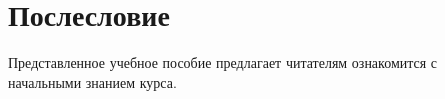 \chapter*{Послесловие}

Представленное учебное пособие предлагает читателям ознакомится с начальными знанием курса. 